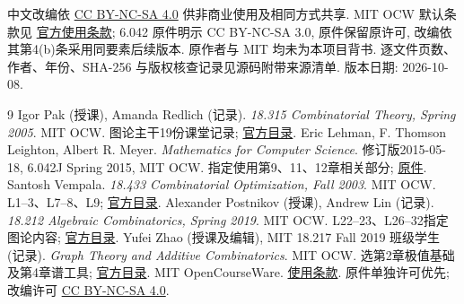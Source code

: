 中文改编依 \href{https://creativecommons.org/licenses/by-nc-sa/4.0/}{CC BY-NC-SA 4.0} 供非商业使用及相同方式共享. MIT OCW 默认条款见 \href{https://ocw.mit.edu/pages/privacy-and-terms-of-use/}{官方使用条款}; 6.042 原件明示 CC BY-NC-SA 3.0, 原件保留原许可, 改编依其第4(b)条采用同要素后续版本. 原作者与 MIT 均未为本项目背书. 逐文件页数、作者、年份、SHA-256 与版权核查记录见源码附带来源清单. 版本日期: 2026-10-08.
\clearpage
\originalcontents
\clearpage
\mainmatter

















\clearpage


\begin{thebibliography}{9}
 Igor Pak (授课), Amanda Redlich (记录). \textit{18.315 Combinatorial Theory, Spring 2005}. MIT OCW. 图论主干19份课堂记录; \href{https://ocw.mit.edu/courses/18-315-combinatorial-theory-introduction-to-graph-theory-extremal-and-enumerative-combinatorics-spring-2005/pages/lecture-notes/}{官方目录}.
 Eric Lehman, F. Thomson Leighton, Albert R. Meyer. \textit{Mathematics for Computer Science}. 修订版2015-05-18, 6.042J Spring 2015, MIT OCW. 指定使用第9、11、12章相关部分; \href{https://ocw.mit.edu/courses/6-042j-mathematics-for-computer-science-spring-2015/resources/mit6_042js15_textbook/}{原件}.
 Santosh Vempala. \textit{18.433 Combinatorial Optimization, Fall 2003}. MIT OCW. L1--3、L7--8、L9; \href{https://ocw.mit.edu/courses/18-433-combinatorial-optimization-fall-2003/pages/lecture-notes/}{官方目录}.
 Alexander Postnikov (授课), Andrew Lin (记录). \textit{18.212 Algebraic Combinatorics, Spring 2019}. MIT OCW. L22--23、L26--32指定图论内容; \href{https://ocw.mit.edu/courses/18-212-algebraic-combinatorics-spring-2019/pages/lecture-notes/}{官方目录}.
 Yufei Zhao (授课及编辑), MIT 18.217 Fall 2019 班级学生 (记录). \textit{Graph Theory and Additive Combinatorics}. MIT OCW. 选第2章极值基础及第4章谱工具; \href{https://ocw.mit.edu/courses/18-217-graph-theory-and-additive-combinatorics-fall-2019/pages/lecture-notes/}{官方目录}.
 MIT OpenCourseWare. \href{https://ocw.mit.edu/pages/privacy-and-terms-of-use/}{使用条款}. 原件单独许可优先; 改编许可 \href{https://creativecommons.org/licenses/by-nc-sa/4.0/}{CC BY-NC-SA 4.0}.
\end{thebibliography}

